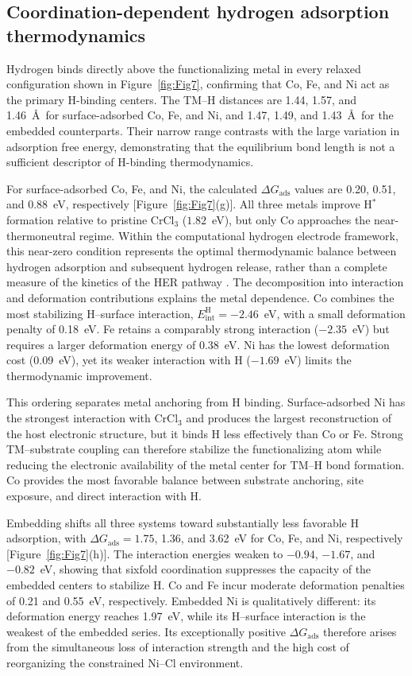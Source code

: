 \documentclass[journal=jacsat,manuscript=article]{achemso}
\begin{document}
\subsection{Coordination-dependent hydrogen adsorption thermodynamics}

\noindent Hydrogen binds directly above the functionalizing metal in every relaxed configuration shown in Figure~\ref{fig:Fig7}, confirming that Co, Fe, and Ni act as the primary H-binding centers. The TM--H distances are 1.44, 1.57, and 1.46~\AA\ for surface-adsorbed Co, Fe, and Ni, and 1.47, 1.49, and 1.43~\AA\ for the embedded counterparts. Their narrow range contrasts with the large variation in adsorption free energy, demonstrating that the equilibrium bond length is not a sufficient descriptor of H-binding thermodynamics.

For surface-adsorbed Co, Fe, and Ni, the calculated $\Delta G_{\mathrm{ads}}$ values are 0.20, 0.51, and 0.88~eV, respectively [Figure~\ref{fig:Fig7}(g)]. All three metals improve H$^*$ formation relative to pristine CrCl$_3$ ($1.82$~eV), but only Co approaches the near-thermoneutral regime. Within the computational hydrogen electrode framework, this near-zero condition represents the optimal thermodynamic balance between hydrogen adsorption and subsequent hydrogen release, rather than a complete measure of the kinetics of the HER pathway \cite{Norskov_2005,Liao2022}. The decomposition into interaction and deformation contributions explains the metal dependence. Co combines the most stabilizing H--surface interaction, $E_{\mathrm{int}}^{\mathrm H}=-2.46$~eV, with a small deformation penalty of 0.18~eV. Fe retains a comparably strong interaction ($-2.35$~eV) but requires a larger deformation energy of 0.38~eV. Ni has the lowest deformation cost (0.09~eV), yet its weaker interaction with H ($-1.69$~eV) limits the thermodynamic improvement.

This ordering separates metal anchoring from H binding. Surface-adsorbed Ni has the strongest interaction with CrCl$_3$ and produces the largest reconstruction of the host electronic structure, but it binds H less effectively than Co or Fe. Strong TM--substrate coupling can therefore stabilize the functionalizing atom while reducing the electronic availability of the metal center for TM--H bond formation. Co provides the most favorable balance between substrate anchoring, site exposure, and direct interaction with H.

Embedding shifts all three systems toward substantially less favorable H adsorption, with $\Delta G_{\mathrm{ads}}=1.75$, 1.36, and 3.62~eV for Co, Fe, and Ni, respectively [Figure~\ref{fig:Fig7}(h)]. The interaction energies weaken to $-0.94$, $-1.67$, and $-0.82$~eV, showing that sixfold coordination suppresses the capacity of the embedded centers to stabilize H. Co and Fe incur moderate deformation penalties of 0.21 and 0.55~eV, respectively. Embedded Ni is qualitatively different: its deformation energy reaches 1.97~eV, while its H--surface interaction is the weakest of the embedded series. Its exceptionally positive $\Delta G_{\mathrm{ads}}$ therefore arises from the simultaneous loss of interaction strength and the high cost of reorganizing the constrained Ni--Cl environment.
\end{document}
